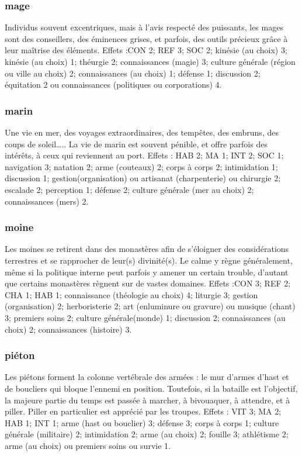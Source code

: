 \documentclass[10pt,a4paper,twocolumn]{book}
\begin{document}
\subsubsection{mage}
Individus souvent excentriques, mais à l’avis respecté des puissants, les mages sont des conseillers, des éminences grises, et parfois, des outils précieux grâce à leur maîtrise des éléments.
Effets :CON 2; REF 3; SOC 2; kinésie (au choix) 3; kinésie (au choix) 1; théurgie 2; connaissances (magie) 3; culture générale (région ou ville au choix) 2; connaissances (au choix) 1; défense 1; discussion 2; équitation 2 ou connaissances (politiques ou corporations) 4.
\subsubsection{marin}
Une vie en mer, des voyages extraordinaires, des tempêtes, des embruns, des coups de soleil….. La vie de marin est souvent pénible, et offre parfois des intérêts, à ceux qui reviennent au port.
Effets : HAB 2; MA 1; INT 2; SOC 1; navigation 3; natation 2; arme (couteaux) 2; corps à corps 2; intimidation 1; discussion 1; gestion(organisation) ou artisanat (charpenterie) ou chirurgie 2; escalade 2; perception 1; défense 2; culture générale (mer au choix) 2; connaissances (mers) 2.
\subsubsection{moine}
Les moines se retirent dans des monastères afin de s’éloigner des considérations terrestres et se rapprocher de leur(s) divinité(s). Le calme y règne généralement, même si la politique interne peut parfois y amener un certain trouble, d’autant que certains monastères règnent sur de vastes domaines.
Effets :CON 3; REF 2; CHA 1; HAB 1; connaissance (théologie au choix) 4; liturgie 3; gestion (organisation) 2; herboristerie 2; art (enluminure ou gravure) ou musique (chant) 3; premiers soins 2; culture générale(monde) 1; discussion 2; connaissances (au choix) 2; connaissances (histoire) 3.
\subsubsection{piéton}
Les piétons forment la colonne vertébrale des armées : le mur d’armes d’hast et de boucliers qui bloque l’ennemi en position. Toutefois, si la bataille est l’objectif, la majeure partie du temps est passée à marcher, à bivouaquer, à attendre, et à piller. Piller en particulier est apprécié par les troupes.
Effets : VIT 3; MA 2; HAB 1; INT 1; arme (hast ou bouclier) 3; défense 3; corps à corps 1; culture générale (militaire) 2; intimidation 2; arme (au choix) 2; fouille 3; athlétisme 2; arme (au choix) ou premiers soins ou survie 1.
\end{document}

